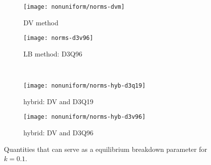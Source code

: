 \documentclass{elsarticle} %
\begin{document}
\begin{figure}
    \centering
    \begin{subfigure}[b]{0.5\textwidth}
        \texttt{[image: nonuniform/norms-dvm]}
        \caption{DV method}
        \label{fig:norms:dvm}
    \end{subfigure}%
    \begin{subfigure}[b]{0.5\textwidth}
        \texttt{[image: norms-d3v96]}
        \caption{LB method: D3Q96}
        \label{fig:norms:d3q96}
    \end{subfigure}\\
    \begin{subfigure}[b]{0.5\textwidth}
        \texttt{[image: nonuniform/norms-hyb-d3q19]}
        \caption{hybrid: DV and D3Q19}
        \label{fig:norms:d3q19-hyb}
    \end{subfigure}%
    \begin{subfigure}[b]{0.5\textwidth}
        \texttt{[image: nonuniform/norms-hyb-d3v96]}
        \caption{hybrid: DV and D3Q96}
        \label{fig:norms:d3q96-hyb}
    \end{subfigure}
    \caption{
       Quantities that can serve as a equilibrium breakdown parameter for \(k=0.1\).
    }\label{fig:norms}
\end{figure}
\end{document}
